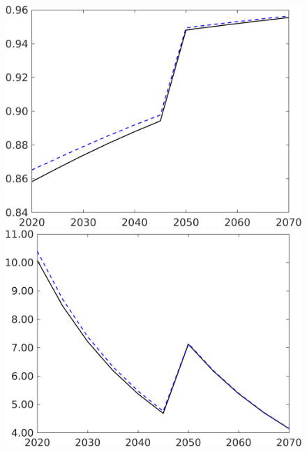\begin{figure}[h!!]
\begin{minipage}[]{0.32\textwidth}
	\end{minipage}
	\begin{minipage}[]{0.32\textwidth}
		\includegraphics[width=1\textwidth]{../../codding_model/own_basedOnFried/optimalPol_190722_tidiedUp/figures/all_10Aout22/comp_benchregime3_notaul2_OPT_T_NoTaus_tauf_spillover0_noskill0_sep1_xgrowth0_PV1_etaa0.79_lgd0.png}
	\end{minipage}
	\begin{minipage}[]{0.32\textwidth}
		\includegraphics[width=1\textwidth]{../../codding_model/own_basedOnFried/optimalPol_190722_tidiedUp/figures/all_10Aout22/S_PercentageLfDynNT_noeff_Target_regime3_spillover0_noskill0_sep1_xgrowth0_etaa0.79_lgd0.png}

\end{minipage}
\end{figure}
